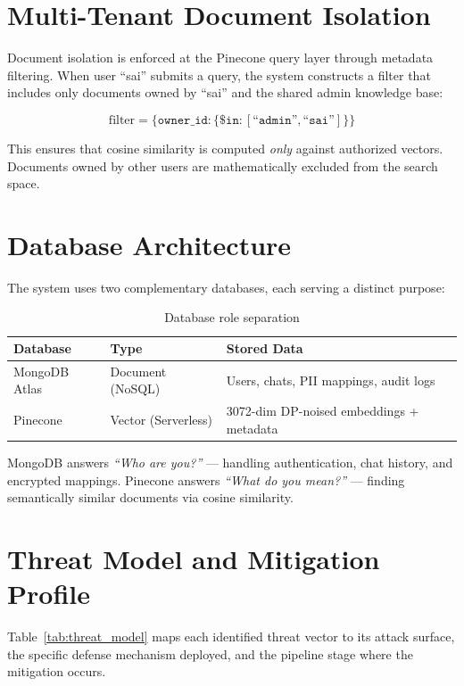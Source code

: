 \section{Multi-Tenant Document Isolation}

Document isolation is enforced at the Pinecone query layer through metadata filtering. When user ``sai'' submits a query, the system constructs a filter that includes only documents owned by ``sai'' and the shared admin knowledge base:

\begin{equation}
\text{filter} = \{\texttt{owner\_id} : \{\texttt{\$in} : [\texttt{``admin''}, \texttt{``sai''}]\}\}
\end{equation}

This ensures that cosine similarity is computed \textit{only} against authorized vectors. Documents owned by other users are mathematically excluded from the search space.

\section{Database Architecture}

The system uses two complementary databases, each serving a distinct purpose:

\begin{table}[H]
\centering
\caption{Database role separation}
\label{tab:db}
\begin{tabular}{lll}
\toprule
\textbf{Database} & \textbf{Type} & \textbf{Stored Data} \\
\midrule
MongoDB Atlas & Document (NoSQL) & Users, chats, PII mappings, audit logs \\
Pinecone & Vector (Serverless) & 3072-dim DP-noised embeddings + metadata \\
\bottomrule
\end{tabular}
\end{table}

MongoDB answers \textit{``Who are you?''} --- handling authentication, chat history, and encrypted mappings. Pinecone answers \textit{``What do you mean?''} --- finding semantically similar documents via cosine similarity.

\section{Threat Model and Mitigation Profile}

Table~\ref{tab:threat_model} maps each identified threat vector to its attack surface, the specific defense mechanism deployed, and the pipeline stage where the mitigation occurs.

